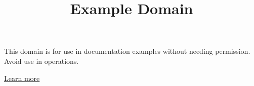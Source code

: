 \documentclass[11pt,a4paper]{article}
\title{Example Domain}
\begin{document}
\maketitle

This domain is for use in documentation examples without needing permission. Avoid use in operations.

\href{https://iana.org/domains/example}{Learn more}
\end{document}

